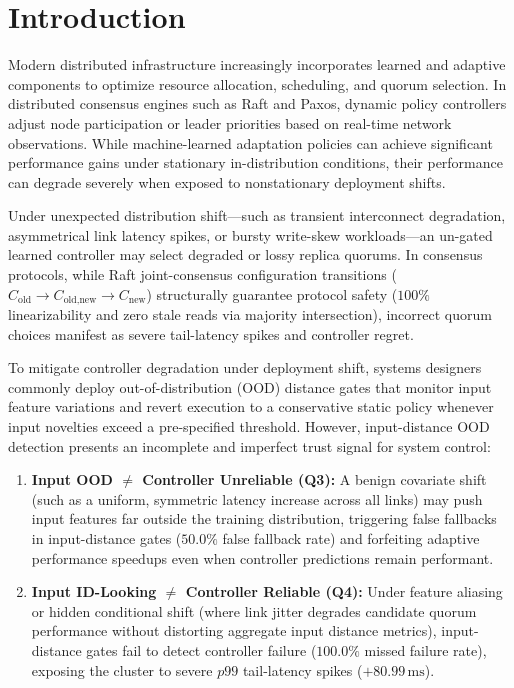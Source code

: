 \section{Introduction}
\label{sec:intro}

Modern distributed infrastructure increasingly incorporates learned and adaptive components to optimize resource allocation, scheduling, and quorum selection. In distributed consensus engines such as Raft and Paxos, dynamic policy controllers adjust node participation or leader priorities based on real-time network observations. While machine-learned adaptation policies can achieve significant performance gains under stationary in-distribution conditions, their performance can degrade severely when exposed to nonstationary deployment shifts.

Under unexpected distribution shift—such as transient interconnect degradation, asymmetrical link latency spikes, or bursty write-skew workloads—an un-gated learned controller may select degraded or lossy replica quorums. In consensus protocols, while Raft joint-consensus configuration transitions ($C_{\text{old}} \to C_{\text{old,new}} \to C_{\text{new}}$) structurally guarantee protocol safety ($100\%$ linearizability and zero stale reads via majority intersection), incorrect quorum choices manifest as severe tail-latency spikes and controller regret.

To mitigate controller degradation under deployment shift, systems designers commonly deploy out-of-distribution (OOD) distance gates that monitor input feature variations and revert execution to a conservative static policy whenever input novelties exceed a pre-specified threshold. However, input-distance OOD detection presents an incomplete and imperfect trust signal for system control:
\begin{enumerate}
    \item \textbf{Input OOD $\neq$ Controller Unreliable (Q3):} A benign covariate shift (such as a uniform, symmetric latency increase across all links) may push input features far outside the training distribution, triggering false fallbacks in input-distance gates ($50.0\%$ false fallback rate) and forfeiting adaptive performance speedups even when controller predictions remain performant.
    \item \textbf{Input ID-Looking $\neq$ Controller Reliable (Q4):} Under feature aliasing or hidden conditional shift (where link jitter degrades candidate quorum performance without distorting aggregate input distance metrics), input-distance gates fail to detect controller failure ($100.0\%$ missed failure rate), exposing the cluster to severe $p99$ tail-latency spikes ($+80.99\,\text{ms}$).
\end{enumerate}

